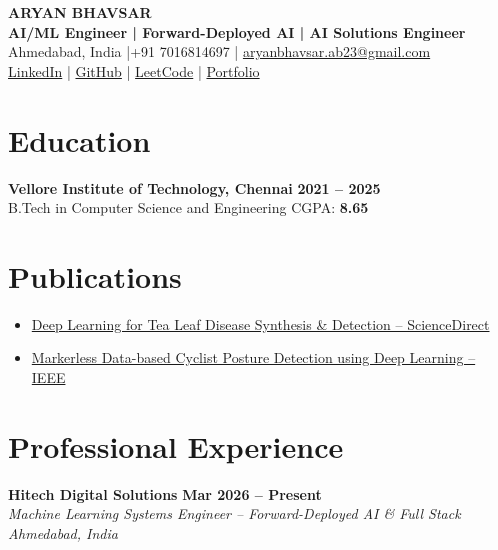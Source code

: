 \documentclass[10pt,a4paper]{extarticle}
\newcommand{\experience}[4]{%
  \textbf{#1} \hfill \textbf{#2}\\[-1pt]
  \textit{#3} \hfill \textit{#4}\\[-4pt]
}
\begin{document}
\begin{center}
  {\LARGE\textbf{ARYAN BHAVSAR}}\\[2pt]
  \textbf{AI/ML Engineer | Forward-Deployed AI | AI Solutions Engineer}\\[2pt]
  Ahmedabad, India \quad|\quad +91 7016814697 \quad|\quad
  \href{mailto:aryanbhavsar.ab23@gmail.com}{aryanbhavsar.ab23@gmail.com}\\[2pt]
  \href{https://linkedin.com/in/-aryan-bhavsar}{LinkedIn}
  \quad|\quad
  \href{https://github.com/driizzyybreezzyy}{GitHub}
  \quad|\quad
  \href{https://leetcode.com/u/driizzyybreezzyy/}{LeetCode}
  \quad|\quad
  \href{https://aryan-portfolio-888.vercel.app/}{Portfolio}
\end{center}
\vspace{-6pt}

\section{Education}
\textbf{Vellore Institute of Technology, Chennai}
\hfill \textbf{2021 -- 2025}\\[-1pt]
B.Tech in Computer Science and Engineering
\hfill CGPA: \textbf{8.65}

\section{Publications}
\begin{itemize}
  \item \href{https://www.sciencedirect.com/science/article/pii/S2590123024020279}{Deep Learning for Tea Leaf Disease Synthesis \& Detection -- ScienceDirect}
  \item \href{https://ieeexplore.ieee.org/abstract/document/11135949}{Markerless Data-based Cyclist Posture Detection using Deep Learning -- IEEE}
\end{itemize}

\section{Professional Experience}

\experience
{Hitech Digital Solutions}
{Mar 2026 -- Present}
{Machine Learning Systems Engineer -- Forward-Deployed AI \& Full Stack}
{Ahmedabad, India}
\end{document}
